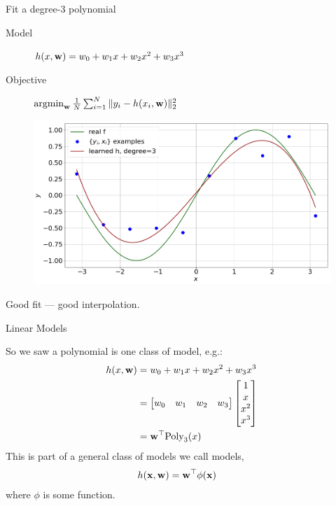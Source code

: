 \documentclass[lualatex, aspectratio=169]{beamer}
\begin{document}



\begin{frame}{Fit a degree-3 polynomial}

  \begin{description}
    \item[Model] $h(x, \mathbf{w}) = w_0 + w_1 x + w_2 x^2 + w_3 x^3$
    \item[Objective] $\argmin_{\v{w}} \frac{1}{N} \sum^N_{i=1} \|y_i - h(x_i, \v{w})\|^2_2$ 
  \end{description}

  \begin{figure}
    \includegraphics[width=0.5\pagewidth]{assets/poly3.png}
  \end{figure}

  Good fit --- good interpolation.

\end{frame}


\begin{frame}{Linear Models}

  So we saw a polynomial is one class of model, e.g.:
  \begin{align*}
    h(x, \mathbf{w}) &= w_0 + w_1 x + w_2 x^2 + w_3 x^3 \\
                &= \begin{bmatrix} w_0 & w_1 & w_2 & w_3 \end{bmatrix}
                   \begin{bmatrix} 1 \\ x \\ x^2 \\ x^3 \end{bmatrix} \\
                   &= \mathbf{w}^\top \text{Poly}_3(x)
  \end{align*}
  This is part of a general class of models we call  models,
  \begin{align*}
    h(\mathbf{x}, \mathbf{w}) &= \mathbf{w}^\top \phi(\mathbf{x})
  \end{align*}
  where $\phi$ is some function.

\end{frame}
\end{document}
